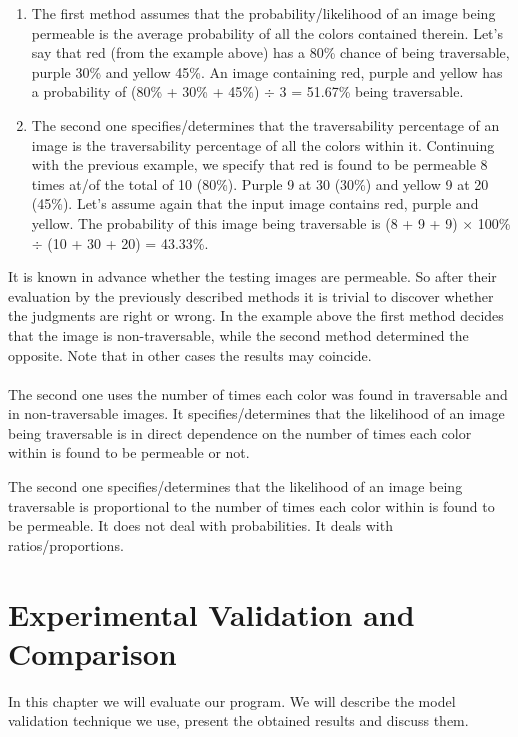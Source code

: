 \documentclass[12pt,a4paper]{report}
\begin{document}
	\begin{enumerate}
		\item The first method assumes that the probability/likelihood of an image being permeable is the average probability of all the colors contained therein. Let's say that red (from the example above) has a 80\% chance of being traversable, purple 30\% and yellow 45\%. An image containing red, purple and yellow has a probability of (80\% + 30\% + 45\%) $\div$ 3 = 51.67\% being traversable.
		\item The second one specifies/determines that the traversability percentage of an image is the traversability percentage of all the colors within it. Continuing with the previous example, we specify that red is found to be permeable 8 times at/of the total of 10 (80\%). Purple 9 at 30 (30\%) and yellow 9 at 20 (45\%). Let's assume again that the input image contains red, purple and yellow. The probability of this image being traversable is (8 + 9 + 9) $\times$ 100\% $\div$ (10 + 30 + 20) = 43.33\%.
	\end{enumerate}
	
	It is known in advance whether the testing images are permeable. So after their 
	evaluation by the previously described methods it is trivial to discover whether the 
	judgments are right or wrong. In the example above the first method decides that the 
	image is non-traversable, while the second method determined the opposite. Note that 
	in other cases the results may coincide.
	\\\\ 
	
	The second one uses the number of times each color was found in traversable and in non-traversable images. It specifies/determines that the likelihood of an image being traversable is in direct dependence on the number of times each color within is found to be permeable or not.
	
	The second one specifies/determines that the likelihood of an image being traversable is proportional to the number of times each color within is found to be permeable. It does not deal with probabilities. It deals with ratios/proportions.
	
	
	
	\chapter{Experimental Validation and Comparison}
	\label{sec:exp}
	
	In this chapter we will evaluate our program. We will describe the model validation 
	technique we use, present the obtained results and discuss them.
	\\
	
\end{document}
